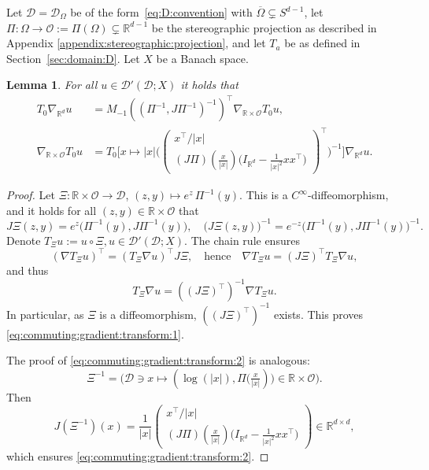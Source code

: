 \documentclass[12pt,a4paper, reqno]{amsart}
\theoremstyle{plain}
\newtheorem{lemma}[theorem]{Lemma}
\theoremstyle{definition}
\theoremstyle{remark}
\numberwithin{equation}{section}
\newcommand{\1}{\mathbbm{1}}
\newcommand{\R}{\ensuremath{\mathbb{R}}}
\newcommand{\calO}{\ensuremath{\mathcal{O}}}
\newcommand{\calD}{\ensuremath{\mathcal{D}}}
\newcommand{\scrD}{\ensuremath{\mathscr{D}}}
\begin{document}
Let $\calD=\calD_\Omega$ be of the form~\eqref{eq:D:convention} with $\overline{\Omega}\subsetneq S^{d-1}$, 
let $\Pi\colon \Omega\to \calO:=\Pi(\Omega) \subsetneq \R^{d-1}$ be the stereographic projection as described in Appendix \ref{appendix:stereographic:projection}, and let $T_a$ be as defined in  Section~\ref{sec:domain:D}.
Let $X$ be a Banach space. 

\begin{lemma}\label{commuting:gradient:transform}
For all $u\in \scrD'(\calD;X)$ it  holds that 
    \begin{align}\label{eq:commuting:gradient:transform:1}
        T_0 \nabla_{\R^d} u &= M_{-1}((\Pi^{-1},J\Pi^{-1})^{-1})^\top\nabla_{\R\times \calO} T_0 u, 
    \\\label{eq:commuting:gradient:transform:2}
\nabla_{\R\times \calO} T_0u &= T_0 \Bigg[ x\mapsto |x| \bigg(\begin{pmatrix}
    x^\top/|x| \\
    (J\Pi)(\frac{x}{|x|})\big(I_{\R^d}-\frac{1}{|x|^2}xx^\top \big)
\end{pmatrix}^\top\bigg)^{-1} \Bigg]\nabla_{\R^d}  u.
    \end{align}
\end{lemma}
\begin{proof}
    Let 
    $\Xi\colon \R\times \calO \rightarrow \calD$, $ (z,y)\mapsto e^z\,\Pi^{-1}(y)$. This is a $C^\infty$-diffeomorphism, and it holds for all $(z,y)\in \R\times\calO$ that
    \begin{equation}
        J\Xi(z,y) =e^z \big(\Pi^{-1}(y), J\Pi^{-1}(y)\big), \quad \big(J\Xi(z,y)\big)^{-1}= e^{-z}\big(\Pi^{-1}(y),J\Pi^{-1}(y)\big)^{-1}.
    \end{equation}
Denote $T_\Xi u:= u\circ\Xi, u\in \scrD'(\calD;X)$. The chain rule ensures 
    \[
    (\nabla T_\Xi u)^\top = (T_\Xi \nabla u)^\top J\Xi, \quad \text{hence}\quad \nabla T_\Xi u = (J\Xi)^\top T_\Xi \nabla u,
    \]
    and thus
    \[T_\Xi \nabla u = ((J\Xi)^\top)^{-1} \nabla T_\Xi u. \]
    In particular, as $\Xi$ is a diffeomorphism,  $((J\Xi)^\top)^{-1}$ exists.
This proves \eqref{eq:commuting:gradient:transform:1}. 

The proof of \eqref{eq:commuting:gradient:transform:2} is analogous: 
\[\Xi^{-1}= \Big( \calD\ni x \mapsto(\log(|x|), \Pi\big(\tfrac{x}{|x|})\big)\in \R\times \calO \Big).\]
Then 
\[
J(\Xi^{-1})(x)= \frac{1}{|x|} \begin{pmatrix}
    x^\top/|x| \\
    (J\Pi)(\frac{x}{|x|})\big(I_{\R^d}-\frac{1}{|x|^2}xx^\top \big)
\end{pmatrix}\in \R^{d\times d},
\]
which  ensures \eqref{eq:commuting:gradient:transform:2}.    
\end{proof}
\end{document}

